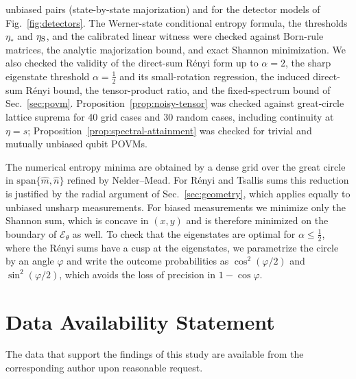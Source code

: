 \documentclass[aps,pra,twocolumn,superscriptaddress,nofootinbib,floatfix]{revtex4-2}
\theoremstyle{definition}
\newcommand{\mhat}{\hat m}
\newcommand{\nhat}{\hat n}
\begin{document}
unbiased pairs (state-by-state majorization) and for the detector models of
Fig.~\ref{fig:detectors}. The Werner-state conditional entropy formula, the
thresholds $\eta_*$ and $\eta_{\rm S}$, and the calibrated linear witness were
checked against Born-rule matrices, the analytic majorization bound, and exact
Shannon minimization. We also checked the validity of the direct-sum R\'enyi
form up to $\alpha=2$, the sharp eigenstate threshold $\alpha=\frac12$ and its
small-rotation regression, the induced direct-sum R\'enyi bound, the
tensor-product ratio, and the fixed-spectrum bound of Sec.~\ref{sec:povm}.
Proposition~\ref{prop:noisy-tensor} was checked against great-circle lattice
suprema for 40 grid cases and 30 random cases, including continuity at
$\eta=s$; Proposition~\ref{prop:spectral-attainment} was checked for trivial
and mutually unbiased qubit POVMs.

The numerical entropy minima are obtained by a dense grid over the great circle in
$\mathrm{span}\{\mhat,\nhat\}$ refined by Nelder--Mead. For R\'enyi and Tsallis
sums this reduction is justified by the radial argument of
Sec.~\ref{sec:geometry}, which applies equally to unbiased unsharp
measurements. For biased measurements we minimize only the Shannon sum, which
is concave in $(x,y)$ and is therefore minimized on the boundary of
$\mathcal{E}_\theta$ as well. To check that the eigenstates are optimal for
$\alpha\le\frac12$, where the R\'enyi sums have a cusp at the eigenstates, we
parametrize the circle by an angle $\varphi$ and write the outcome probabilities
as $\cos^2(\varphi/2)$ and $\sin^2(\varphi/2)$, which avoids the loss of
precision in $1-\cos\varphi$.

\section*{Data Availability Statement}
The data that support the findings of this study are available from the
corresponding author upon reasonable request.


\end{document}
